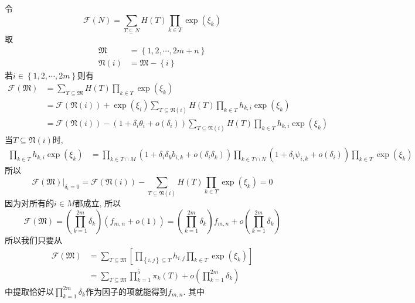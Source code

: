 \documentclass{article}
\newcommand{\sbrace}[1]{\left(#1\right)}
\newcommand{\mbrace}[1]{\left[#1\right]}
\newcommand{\bbrace}[1]{\left\{#1\right\}}
\newcommand{\eval}[2]{\left.{#1}\right|_{#2}}
\newcommand{\FM}{\mathfrak{M}}
\newcommand{\FN}{\mathfrak{N}}
\newcommand{\CF}{\mathcal{F}}
\begin{document}
令
\begin{equation}
  \CF(N)=\sum_{T\subseteq N}{H(T)\prod_{k\in T}{\exp(\xi_k)}}
\end{equation}
取
\begin{equation}
\begin{aligned}
  \FM&=\bbrace{1,2,\cdots,2m+n} \\ 
  \FN(i)&=\FM - \bbrace{i}
\end{aligned}
\end{equation}
若$i\in \bbrace{1,2,\cdots,2m}$则有
\begin{equation}
\begin{aligned}
  \CF(\FM)&=\sum_{T\subseteq \FM}{H(T)\prod_{k\in T}{\exp(\xi_k)}} \\ 
  &=\CF(\FN(i))+\exp(\xi_i)\sum_{T\subseteq \FN(i)}{H(T)\prod_{k\in T}{h_{k,i}\exp(\xi_k)}} \\
  &=\CF(\FN(i))-(1+\delta_i \theta_i+o(\delta_i))\sum_{T\subseteq \FN(i)}{H(T)\prod_{k\in T}{h_{k,i}\exp(\xi_k)}}
\end{aligned}
\end{equation}
当$T\subseteq \FN(i)$时, 
\begin{equation}
\begin{aligned}
  \prod_{k\in T}{h_{k,i}\exp(\xi_k)}&=\prod_{k\in T \cap M}{\sbrace{1+\delta_i \delta_k b_{i,k}+o(\delta_i \delta_k)}}\prod_{k\in T \cap N}\sbrace{1+\delta_i \psi_{i,k}+o(\delta_i)}\prod_{k\in T}{\exp(\xi_k)}
\end{aligned}
\end{equation}
所以 
\begin{equation}
  \eval{\CF(\FM)}{\delta_i=0}=\CF(\FN(i))-\sum_{T\subseteq \FN(i)}{H(T)\prod_{k\in T}{\exp(\xi_k)}}=0
\end{equation}
因为对所有的$i\in M$都成立, 所以 
\begin{equation}
  \CF(\FM)=\sbrace{\prod_{k=1}^{2m}{\delta_k}}\sbrace{f_{m,n}+o(1)}=\sbrace{\prod_{k=1}^{2m}{\delta_k}}f_{m,n}+o\sbrace{\prod_{k=1}^{2m}{\delta_k}}
\end{equation}
所以我们只要从 
\begin{equation}
\begin{aligned}
\CF(\FM)&=\sum_{T\subseteq \FM}\mbrace{\prod_{\bbrace{i,j}\subseteq T}{h_{i,j}}\prod_{k\in T}{\exp(\xi_k)}} \\ 
&=\sum_{T\subseteq \FM}{\prod_{k=1}^5{\pi_k(T)}}+o\sbrace{\prod_{k=1}^{2m}{\delta_k}}
\end{aligned}
\end{equation}
中提取恰好以$\prod_{k=1}^{2m}{\delta_k}$作为因子的项就能得到$f_{m,n}$. 其中 
\end{document}
